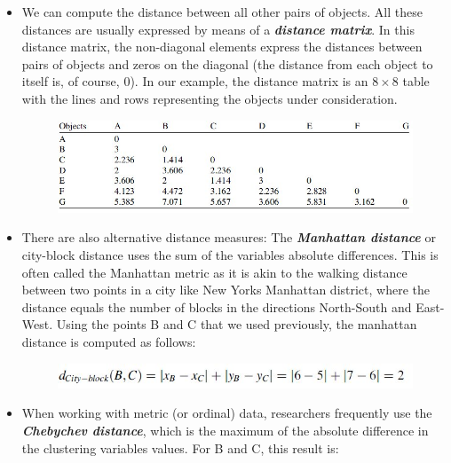 \documentclass[a4paper,12pt]{article}
\begin{document}
\begin{itemize}
\item We can compute the distance between all other pairs of objects. All
these distances are usually expressed by means of a \textit{\textbf{distance matrix}}. In this distance
matrix, the non-diagonal elements express the distances between pairs of objects
and zeros on the diagonal (the distance from each object to itself is, of course, 0). In
our example, the distance matrix is an $8 \times 8$ table with the lines and rows
representing the objects under consideration.
\begin{figure}[h!]
	\begin{center}
		\includegraphics[scale=0.6]{images/DistanceMatrix.jpg}\\
	\end{center}
\end{figure}

\item There are also alternative distance measures: The \textbf{\textit{Manhattan distance}} or city-block distance uses the sum of the variables absolute differences. This is often called the Manhattan metric
as it is akin to the walking distance between two points in a city like New Yorks
Manhattan district, where the distance equals the number of blocks in the directions
North-South and East-West. Using the points B and C that we used previously, the manhattan distance is computed as follows:
\begin{figure}[h!]
	\begin{center}
		\includegraphics[scale=0.6]{images/Manhattan.jpg}\\
	\end{center}
\end{figure}


\item When working with metric (or ordinal) data, researchers frequently use
the \textbf{\textit{Chebychev distance}}, which is the maximum of the absolute difference in the
clustering variables values. For B and C, this result is:


\end{itemize}
\end{document}
